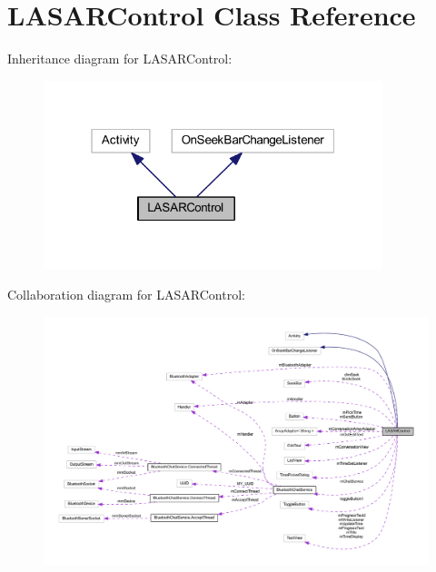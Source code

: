 \hypertarget{classcom_1_1example_1_1android_1_1_bluetooth_chat_1_1_l_a_s_a_r_control}{\section{L\-A\-S\-A\-R\-Control Class Reference}
\label{classcom_1_1example_1_1android_1_1_bluetooth_chat_1_1_l_a_s_a_r_control}
}


Inheritance diagram for L\-A\-S\-A\-R\-Control\-:\nopagebreak
\begin{figure}[H]
\begin{center}
\leavevmode
\includegraphics[width=280pt]{classcom_1_1example_1_1android_1_1_bluetooth_chat_1_1_l_a_s_a_r_control__inherit__graph}
\end{center}
\end{figure}


Collaboration diagram for L\-A\-S\-A\-R\-Control\-:\nopagebreak
\begin{figure}[H]
\begin{center}
\leavevmode
\includegraphics[width=350pt]{classcom_1_1example_1_1android_1_1_bluetooth_chat_1_1_l_a_s_a_r_control__coll__graph}
\end{center}
\end{figure}
